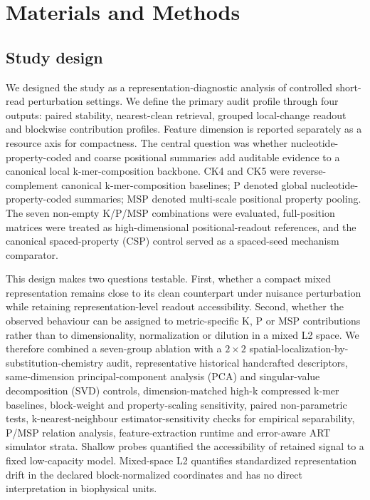 \section{Materials and Methods}

\subsection{Study design}

We designed the study as a representation-diagnostic analysis of controlled short-read perturbation settings. We define the primary audit profile through four outputs: paired stability, nearest-clean retrieval, grouped local-change readout and blockwise contribution profiles. Feature dimension is reported separately as a resource axis for compactness. The central question was whether nucleotide-property-coded and coarse positional summaries add auditable evidence to a canonical local k-mer-composition backbone. CK4 and CK5 were reverse-complement canonical k-mer-composition baselines; P denoted global nucleotide-property-coded summaries; MSP denoted multi-scale positional property pooling. The seven non-empty K/P/MSP combinations were evaluated, full-position matrices were treated as high-dimensional positional-readout references, and the canonical spaced-property (CSP) control served as a spaced-seed mechanism comparator.

This design makes two questions testable. First, whether a compact mixed representation remains close to its clean counterpart under nuisance perturbation while retaining representation-level readout accessibility. Second, whether the observed behaviour can be assigned to metric-specific K, P or MSP contributions rather than to dimensionality, normalization or dilution in a mixed L2 space. We therefore combined a seven-group ablation with a $2\times2$ spatial-localization-by-substitution-chemistry audit, representative historical handcrafted descriptors, same-dimension principal-component analysis (PCA) and singular-value decomposition (SVD) controls, dimension-matched high-k compressed k-mer baselines, block-weight and property-scaling sensitivity, paired non-parametric tests, k-nearest-neighbour estimator-sensitivity checks for empirical separability, P/MSP relation analysis, feature-extraction runtime and error-aware ART simulator strata. Shallow probes quantified the accessibility of retained signal to a fixed low-capacity model. Mixed-space L2 quantifies standardized representation drift in the declared block-normalized coordinates and has no direct interpretation in biophysical units.

